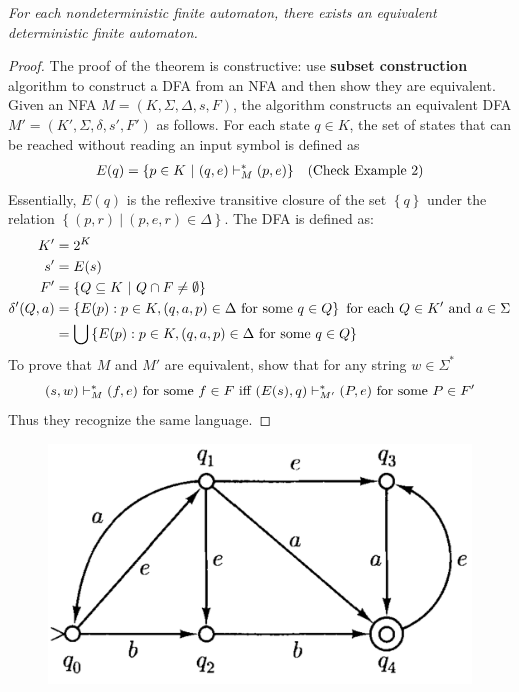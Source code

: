 \begin{theorem}{}
  \textit{For each nondeterministic finite automaton, there exists an equivalent deterministic finite automaton.}
\end{theorem}

\begin{proof}
  The proof of the theorem is constructive: use \textbf{subset construction} algorithm to construct a DFA from an NFA and then show they are equivalent. Given an NFA $M = (K, \Sigma, \Delta, s, F)$, the algorithm constructs an equivalent DFA $M' = (K', \Sigma, \delta, s', F')$ as follows. For each state $q \in K$, the set of states that can be reached without reading an input symbol is defined as
  \begin{align*}
    E(q) = \left\{ p \in K\ |\ (q, e) \vdash^*_M (p, e) \right\}& &\textnormal{(Check Example 2)}
  \end{align*}
  Essentially, $E(q)$ is the reflexive transitive closure of the set $\left\{ q \right\}$ under the relation $\left\{(p, r)\ |\ (p, e, r) \in \Delta \right\}$. The DFA is defined as:
  \begin{align*}
    K' &= 2^K\\
    s' &= E(s)\\
    F' &= \left\{ Q \subseteq K\ |\ Q \cap F \neq \emptyset \right\}\\
    \delta'(Q, a) &= \left\{ E(p) : p \in K, (q, a, p) \in \Delta \textnormal{ for some } q \in Q \right\} \textnormal{ for each $Q \in K'$ and $a \in \Sigma$}\\
    &= \bigcup \left\{ E(p) : p \in K, (q, a, p) \in \Delta \textnormal{ for some } q \in Q \right\}
  \end{align*}
  To prove that $M$ and $M'$ are equivalent, show that for any string $w \in \Sigma^*$
  \begin{equation*}
    (s, w) \vdash^*_M (f, e) \textnormal{ for some } f \in F \textnormal{ iff } (E(s), q) \vdash^*_{M'} (P, e) \textnormal{ for some } P \in F'
  \end{equation*}
  Thus they recognize the same language.
\end{proof}

\begin{figure}[ht!]
  \centering
  \includegraphics[width=.3\textwidth]{img/Fig2.9.png}
  \caption{}
\end{figure}

